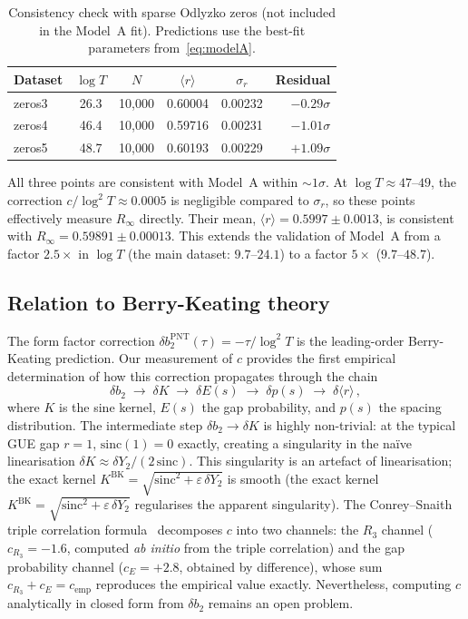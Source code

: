 \documentclass[11pt]{article}
\theoremstyle{plain}
\theoremstyle{remark}
\begin{document}
\begin{table}[ht]
\centering
\caption{Consistency check with sparse Odlyzko zeros (not included in
the Model~A fit). Predictions use the best-fit parameters
from~\eqref{eq:modelA}.}
\label{tab:sparse}
\begin{tabular}{lccccr}
\toprule
Dataset & $\log T$ & $N$ & $\langle r\rangle$ & $\sigma_r$ & Residual \\
\midrule
zeros3 & 26.3 & 10{,}000 & 0.60004 & 0.00232 & $-0.29\sigma$ \\
zeros4 & 46.4 & 10{,}000 & 0.59716 & 0.00231 & $-1.01\sigma$ \\
zeros5 & 48.7 & 10{,}000 & 0.60193 & 0.00229 & $+1.09\sigma$ \\
\bottomrule
\end{tabular}
\end{table}

All three points are consistent with Model~A within $\sim\!1\sigma$.
At $\log T \approx 47$--$49$, the correction $c/\log^2 T \approx 0.0005$
is negligible compared to $\sigma_r$, so these points effectively measure
$R_\infty$ directly. Their mean, $\langle r\rangle = 0.5997 \pm 0.0013$,
is consistent with $R_\infty = 0.59891 \pm 0.00013$. This extends the
validation of Model~A from a factor $2.5\times$ in $\log T$ (the main
dataset: $9.7$--$24.1$) to a factor $5\times$ ($9.7$--$48.7$).

\subsection{Relation to Berry-Keating theory}

The form factor correction $\delta b_2^{\mathrm{PNT}}(\tau) = -\tau/\log^2 T$
is the leading-order Berry-Keating prediction. Our measurement of $c$
provides the first empirical determination of how this correction
propagates through the chain
\[
  \delta b_2 \;\longrightarrow\; \delta K \;\longrightarrow\;
  \delta E(s) \;\longrightarrow\; \delta p(s) \;\longrightarrow\;
  \delta\langle r\rangle\,,
\]
where $K$ is the sine kernel, $E(s)$ the gap probability, and $p(s)$
the spacing distribution. The intermediate step $\delta b_2 \to \delta K$
is highly non-trivial: at the typical GUE gap $r = 1$,
$\mathrm{sinc}(1) = 0$ exactly, creating a singularity in the na\"ive
linearisation $\delta K \approx \delta Y_2 / (2\,\mathrm{sinc})$.
This singularity is an artefact of linearisation; the exact kernel
$K^{\mathrm{BK}} = \sqrt{\mathrm{sinc}^2 + \varepsilon\,\delta Y_2}$
is smooth (the exact kernel
$K^{\mathrm{BK}} = \sqrt{\mathrm{sinc}^2 + \varepsilon\,\delta Y_2}$
regularises the apparent singularity).
The Conrey--Snaith triple correlation formula~\cite{alarcon2026b}
decomposes $c$ into two channels: the $R_3$ channel
($c_{R_3} = -1.6$, computed \emph{ab initio} from the triple correlation)
and the gap probability channel ($c_E = +2.8$, obtained by difference),
whose sum $c_{R_3} + c_E = c_{\mathrm{emp}}$ reproduces the empirical
value exactly. Nevertheless, computing $c$ analytically in closed form
from $\delta b_2$ remains an open problem.
\end{document}
